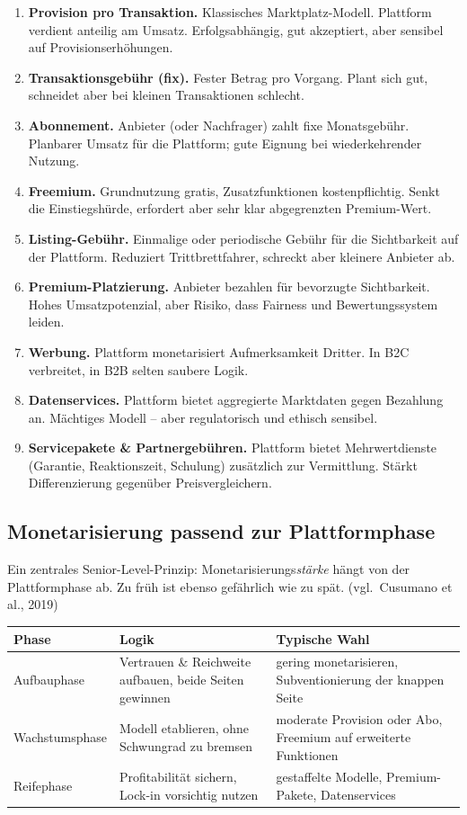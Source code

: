 \documentclass[11pt,a4paper,oneside]{article}
\newcommand{\fachbegriff}[1]{\textbf{#1}}
\newcommand{\quelle}[1]{{\footnotesize\color{lpGray}(#1)}}
\begin{document}
\begin{enumerate}
  \item \fachbegriff{Provision pro Transaktion.} Klassisches Marktplatz-Modell. Plattform verdient anteilig am Umsatz. Erfolgsabhängig, gut akzeptiert, aber sensibel auf Provisionserhöhungen.
  \item \fachbegriff{Transaktionsgebühr (fix).} Fester Betrag pro Vorgang. Plant sich gut, schneidet aber bei kleinen Transaktionen schlecht.
  \item \fachbegriff{Abonnement.} Anbieter (oder Nachfrager) zahlt fixe Monatsgebühr. Planbarer Umsatz für die Plattform; gute Eignung bei wiederkehrender Nutzung.
  \item \fachbegriff{Freemium.} Grundnutzung gratis, Zusatzfunktionen kostenpflichtig. Senkt die Einstiegshürde, erfordert aber sehr klar abgegrenzten Premium-Wert.
  \item \fachbegriff{Listing-Gebühr.} Einmalige oder periodische Gebühr für die Sichtbarkeit auf der Plattform. Reduziert Trittbrettfahrer, schreckt aber kleinere Anbieter ab.
  \item \fachbegriff{Premium-Platzierung.} Anbieter bezahlen für bevorzugte Sichtbarkeit. Hohes Umsatzpotenzial, aber Risiko, dass Fairness und Bewertungssystem leiden.
  \item \fachbegriff{Werbung.} Plattform monetarisiert Aufmerksamkeit Dritter. In B2C verbreitet, in B2B selten saubere Logik.
  \item \fachbegriff{Datenservices.} Plattform bietet aggregierte Marktdaten gegen Bezahlung an. Mächtiges Modell -- aber regulatorisch und ethisch sensibel.
  \item \fachbegriff{Servicepakete \& Partnergebühren.} Plattform bietet Mehrwertdienste (Garantie, Reaktionszeit, Schulung) zusätzlich zur Vermittlung. Stärkt Differenzierung gegenüber Preisvergleichern.
\end{enumerate}

\subsection{Monetarisierung passend zur Plattformphase}

Ein zentrales Senior-Level-Prinzip: Monetarisierungs\emph{stärke} hängt von der Plattformphase ab. Zu früh ist ebenso gefährlich wie zu spät. \quelle{vgl.\ Cusumano et al., 2019}

\begin{tabularx}{\linewidth}{@{}l X X@{}}
\toprule
\textbf{Phase} & \textbf{Logik} & \textbf{Typische Wahl} \\
\midrule
Aufbauphase & Vertrauen \& Reichweite aufbauen, beide Seiten gewinnen & gering monetarisieren, Subventionierung der knappen Seite \\
Wachstumsphase & Modell etablieren, ohne Schwungrad zu bremsen & moderate Provision oder Abo, Freemium auf erweiterte Funktionen \\
Reifephase & Profitabilität sichern, Lock-in vorsichtig nutzen & gestaffelte Modelle, Premium-Pakete, Datenservices \\
\bottomrule
\end{tabularx}
\end{document}
